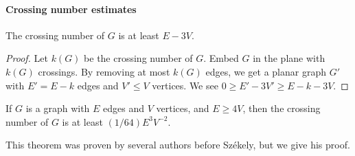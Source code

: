 \paragraph{Crossing number estimates}
\begin{proposition}[1.2]
The crossing number of $G$ is at least $E-3V$.
\end{proposition}
\begin{proof}
Let $k(G)$ be the crossing number of $G$. Embed $G$ in the plane with $k(G)$ crossings. By removing at most $k(G)$ edges, we get a planar graph $G'$ with $E'=E-k$ edges and $V'\leq V$ vertices. We see $0\geq E'-3V'\geq E-k-3V$.
\end{proof}

\begin{theorem}[1.3]
If $G$ is a graph with $E$ edges and $V$ vertices, and $E\geq4V$, then the crossing number of $G$ is at least $(1/64)E^3V^{-2}$.
\end{theorem}
This theorem was proven by several authors before Sz\'ekely, but we give his proof.

